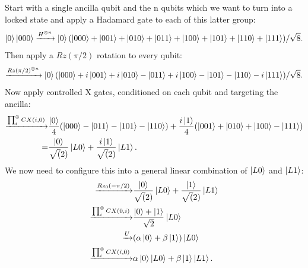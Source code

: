 \documentclass{report}
\begin{document}
\begin{appendices}
Start with a single ancilla qubit and the n qubits which we want to turn into a locked state and apply a Hadamard gate to each of this latter group:
\begin{equation*}
    \ket{0}\ket{000}\xrightarrow{H^{\otimes n}} \ket{0}(\ket{000} + \ket{001} + \ket{010} + \ket{011} + \ket{100} + \ket{101} + \ket{110} + \ket{111})/\sqrt{8}.
\end{equation*}
Then apply a $Rz(\pi/2)$ rotation to every qubit:
\begin{equation*}
    \xrightarrow{Rz(\pi/2)^{\otimes n}} \ket{0}(\ket{000} + i\ket{001} + i \ket{010} - \ket{011} + i \ket{100} - \ket{101} - \ket{110} -i \ket{111})/\sqrt{8}.
\end{equation*} Now apply controlled X gates, conditioned on each qubit and targeting the ancilla:
\begin{align*}
    \xrightarrow{\prod_i^\otimes{CX(i,0)}} &\frac{\ket{0}}{4}(\ket{000} - \ket{011} - \ket{101} - \ket{110})
    + \frac{i\ket{1}}{4}(\ket{001} + \ket{010} + \ket{100} - \ket{111})\\
    = &\frac{\ket{0}}{\sqrt(2)}\ket{L0} + \frac{i\ket{1}}{\sqrt(2)}\ket{L1}.
\end{align*} We now need to configure this into a general linear combination of $\ket{L0}$ and $\ket{L1}$:
\begin{align*}
    \xrightarrow{Rz_0(-\pi/2)} &\frac{\ket{0}}{\sqrt(2)}\ket{L0} + \frac{\ket{1}}{\sqrt(2)}\ket{L1}\\
    \xrightarrow{\prod_i^\otimes{CX(0,i)}} & \frac{\ket{0} + \ket{1}}{\sqrt{2}}\ket{L0}\\
    \xrightarrow{U} & (\alpha\ket{0} + \beta\ket{1})\ket{L0}\\
    \xrightarrow{\prod_i^\otimes{CX(i,0)}} & \alpha\ket{0}\ket{L0} + \beta\ket{1}\ket{L1}.
\end{align*}

\end{appendices}
\end{document}
